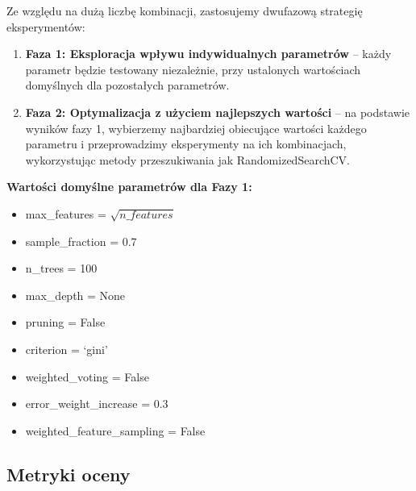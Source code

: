 \documentclass[12pt,a4paper]{article}
\begin{document}
Ze względu na dużą liczbę kombinacji, zastosujemy dwufazową strategię eksperymentów:

\begin{enumerate}
    \item \textbf{Faza 1: Eksploracja wpływu indywidualnych parametrów} -- każdy parametr będzie testowany niezależnie, przy ustalonych wartościach domyślnych dla pozostałych parametrów.

    \item \textbf{Faza 2: Optymalizacja z użyciem najlepszych wartości} -- na podstawie wyników fazy 1, wybierzemy najbardziej obiecujące wartości każdego parametru i przeprowadzimy eksperymenty na ich kombinacjach, wykorzystując metody przeszukiwania jak RandomizedSearchCV.
\end{enumerate}

\textbf{Wartości domyślne parametrów dla Fazy 1:}
\begin{itemize}
    \item max\_features = $\sqrt{n\_features}$
    \item sample\_fraction = 0.7
    \item n\_trees = 100
    \item max\_depth = None
    \item pruning = False
    \item criterion = `gini'
    \item weighted\_voting = False
    \item error\_weight\_increase = 0.3
    \item weighted\_feature\_sampling = False
\end{itemize}

\subsection{Metryki oceny}
\end{document}
